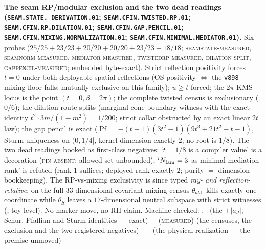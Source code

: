\par\smallskip\noindent\textbf{The seam RP/modular exclusion and
the two dead readings (\texttt{SEAM.STATE.\allowbreak
DERIVATION.01}; \texttt{SEAM.CFIN.TWISTED.\allowbreak RP.01};
\texttt{SEAM.CFIN.RP.\allowbreak DILATION.01};
\texttt{SEAM.CFIN.GAP.\allowbreak PENCIL.01};
\texttt{SEAM.CFIN.MIXING.\allowbreak NORMALIZATION.01};
\texttt{SEAM.CFIN.MINIMAL.\allowbreak MEDIATOR.01}).}
Six probes ($25/25 + 23/23 + 20/20 + 20/20 + 23/23 + 18/18$;
\textsc{seamstate-measured}, \textsc{seamnorm-measured},
\textsc{mediator-measured}, \textsc{twistedrp-measured},
\textsc{dilation-split}, \textsc{gappencil-measured}; embedded
byte-exact).  Strict reflection positivity forces $t = 0$ under
both deployable spatial reflections (OS positivity $\iff$ the
\texttt{v898} mixing floor falls: mutually exclusive on this
family); $u \ge t$ forced; the $2\pi$-KMS locus is the point
$(t{=}0, \beta{=}2\pi)$; the complete twisted census is
exclusionary ($0/6$); the dilation route splits (marginal
cone-boundary witness with the exact identity $t^2 \cdot
3m/(1-m^2) = 1/200$; strict collar obstructed by an exact linear
$2t$ law); the gap pencil is exact
($\operatorname{Pf} = -(t-1)(3t^2-1)(9t^3+21t^2-t-1)$, Sturm
uniqueness on $(0, 1/4]$, kernel dimension exactly $2$; no root
is $1/8$).  The two dead readings booked as first-class
negatives: `$t = 1/8$ is a compiler value' is a decoration
(\textsc{pin-absent}; allowed set unbounded); `$N_{\rm fam} = 3$
as minimal mediation rank' is refuted (rank $1$ suffices;
deployed rank exactly $2$; purity $=$ dimension bookkeeping).
The RP-vs-mixing exclusivity is since typed \emph{ray- and
reflection-relative}: on the full $33$-dimensional covariant
mixing census $\theta_{ab\mathsf T}$ kills exactly one
coordinate while $\theta_S$ leaves a $17$-dimensional neutral
subspace with strict witnesses
(, toy level).
No marker move, no RH claim.
Machine-checked: .
\mE\ (the $\pm|a_J|$, Schur, Pfaffian and Sturm identities ---
exact) $+$ (\textsc{measured}) (the censuses, the exclusion and
the two registered negatives) $+$ \mO\ (the physical realization
--- the premise unmoved)
\par\smallskip

